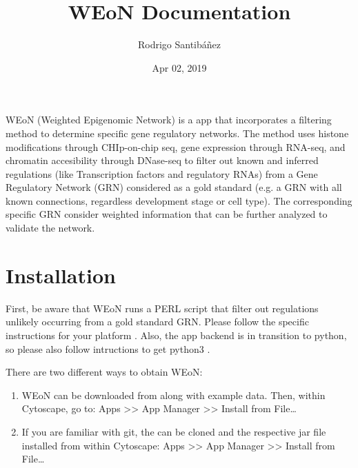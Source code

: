 \documentclass[letterpaper,10pt,english]{sphinxmanual}
\title{WEoN Documentation}
\date{Apr 02, 2019}
\author{Rodrigo Santibáñez}
\begin{document}
\pagestyle{empty}
\sphinxmaketitle
\pagestyle{plain}
\sphinxtableofcontents
\pagestyle{normal}
\label{\detokenize{index::doc}}


WEoN (Weighted Epigenomic Network) is a  app that incorporates a
filtering method to determine specific gene regulatory networks. The method uses
histone modifications through CHIp-on-chip seq, gene expression through
RNA-seq, and chromatin accesibility through DNase-seq to filter out known and
inferred regulations (like Transcription factors and regulatory RNAs) from a
Gene Regulatory Network (GRN) considered as a gold standard (e.g. a GRN with
all known connections, regardless development stage or cell type).
The corresponding specific GRN consider weighted information that can be further
analyzed to validate the network.


\chapter{Installation}
\label{\detokenize{installation:installation}}\label{\detokenize{installation::doc}}
First, be aware that WEoN runs a PERL script that filter out regulations unlikely occurring
from a gold standard GRN. Please follow the specific instructions for your
platform . Also, the app backend is in
transition to python, so please also follow intructions to get python3
.

There are two different ways to obtain WEoN:
\begin{enumerate}
\def\theenumi{\arabic{enumi}}
\def\labelenumi{\theenumi .}
\makeatletter\def\p@enumii{\p@enumi \theenumi .}\makeatother
\item {} 
 WEoN can be downloaded
from 
along with example data. Then, within Cytoscape, go to: Apps \textgreater{}\textgreater{} App Manager \textgreater{}\textgreater{} Install from File…


\item {} 
 If you are familiar
with git, the  can be cloned
and the respective jar file installed from within Cytoscape: Apps \textgreater{}\textgreater{} App Manager \textgreater{}\textgreater{} Install from File…

\end{enumerate}
\end{document}
